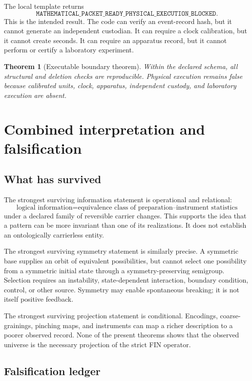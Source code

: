 \documentclass[11pt,a4paper]{article}
\newtheorem{theorem}{Theorem}[section]
\begin{document}
The local template returns
\[
\boxed{\texttt{MATHEMATICAL\_PACKET\_READY\_PHYSICAL\_EXECUTION\_BLOCKED}}.
\]
This is the intended result. The code can verify an event-record hash, but it cannot generate an independent custodian. It can require a clock calibration, but it cannot create seconds. It can require an apparatus record, but it cannot perform or certify a laboratory experiment.

\begin{theorem}[Executable boundary theorem]
Within the declared schema, all structural and deletion checks are reproducible. Physical execution remains false because calibrated units, clock, apparatus, independent custody, and laboratory execution are absent.
\end{theorem}

\section{Combined interpretation and falsification}

\subsection{What has survived}

The strongest surviving information statement is operational and relational:
\[
\text{logical information}=\text{equivalence class of preparation--instrument statistics}
\]
under a declared family of reversible carrier changes. This supports the idea that a pattern can be more invariant than one of its realizations. It does not establish an ontologically carrierless entity.

The strongest surviving symmetry statement is similarly precise. A symmetric base supplies an orbit of equivalent possibilities, but cannot select one possibility from a symmetric initial state through a symmetry-preserving semigroup. Selection requires an instability, state-dependent interaction, boundary condition, control, or other source. Symmetry may enable spontaneous breaking; it is not itself positive feedback.

The strongest surviving projection statement is conditional. Encodings, coarse-grainings, pinching maps, and instruments can map a richer description to a poorer observed record. None of the present theorems shows that the observed universe is the necessary projection of the strict FIN operator.

\subsection{Falsification ledger}
\end{document}
